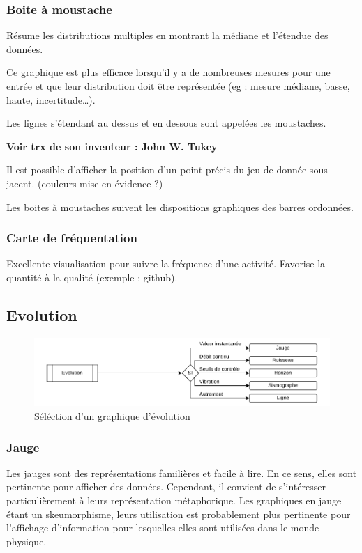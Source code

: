 \documentclass[a4paper,12pt]{article}
\begin{document}
\begin{multicols}{2}
\subsubsection*{Boite à moustache}
\label{sec:org207a947}
Résume les distributions multiples en montrant la médiane et l'étendue des données. \autocite{alansmithLexiqueVisuel}

Ce graphique est plus efficace lorsqu'il y a de nombreuses mesures pour une entrée et que leur distribution doit être représentée (eg : mesure médiane, basse, haute, incertitude\ldots{}). \autocite{mikeyiHowChooseRight2020}

Les lignes s'étendant au dessus et en dessous sont appelées les moustaches. \autocite{wilkeVisualizingManyDistributions2019}

\textbf{Voir trx de son inventeur : John W. Tukey}

Il est possible d'afficher la position d'un point précis du jeu de donnée sous-jacent. (couleurs mise en évidence ?)

Les boites à moustaches suivent les dispositions graphiques des barres ordonnées. \autocite{stephenfewComponentlevelGraphDesign2012}
\subsubsection*{Carte de fréquentation}
\label{sec:orgc657f22}
Excellente visualisation pour suivre la fréquence d'une activité. Favorise la quantité à la qualité (exemple : github). \autocite{alansmithLexiqueVisuel}
\subsection*{Evolution}
\label{sec:org197b0a0}

\begin{figure}
\centering
\includegraphics[width=.9\linewidth]{./img/select-evolution.pdf}
\caption{\label{fig:select-evolution}Séléction d'un graphique d'évolution}
\end{figure}
\subsubsection*{Jauge}
\label{sec:org71e4872}
Les jauges sont des représentations familières et facile à lire. \autocite{jonathanschwabishComparingCategories2021} En ce sens, elles sont pertinente pour afficher des données. Cependant, il convient de s'intéresser particulièrement à leurs représentation métaphorique. Les graphiques en jauge étant un skeumorphisme, leurs utilisation est probablement plus pertinente pour l'affichage d'information pour lesquelles elles sont utilisées dans le monde physique.


\end{multicols}
\end{document}
